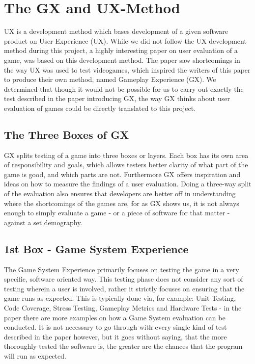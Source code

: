 \section{The GX and UX-Method}
\label{sec:gx_ux_method}
UX is a development method which bases development of a given software product on User Experience (UX).
While we did not follow the UX development method during this project, a highly interesting paper on user evaluation of a game, was based on this development method.
The paper saw shortcomings in the way UX was used to test videogames, which inspired the writers of this paper to produce their own method, named Gameplay Experience (GX).
We determined that though it would not be possible for us to carry out exactly the test described in the paper introducing GX, the way GX thinks about user evaluation of games could be directly translated to this project.

\subsection{The Three Boxes of GX}
GX splits testing of a game into three boxes or layers.
Each box has its own area of responsibility and goals, which allows testers better clarity of what part of the game is good, and which parts are not.
Furthermore GX offers inspiration and ideas on how to measure the findings of a user evaluation.
Doing a three-way split of the evaluation also ensures that developers are better off in understanding where the shortcomings of the games are, for as GX shows us, it is not always enough to simply evaluate a game - or a piece of software for that matter - against a set demography.

\subsection{1st Box - Game System Experience}
The Game System Experience primarily focuses on testing the game in a very specific, software oriented way.
This testing phase does not consider any sort of testing wherein a user is involved, rather it strictly focuses on ensuring that the game runs as expected.
This is typically done via, for example: Unit Testing, Code Coverage, Stress Testing, Gameplay Metrics and Hardware Tests - in the paper there are more examples on how a Game System evaluation can be conducted.
It is not necessary to go through with every single kind of test described in the paper however, but it goes without saying, that the more thoroughly tested the software is, the greater are the chances that the program will run as expected.

